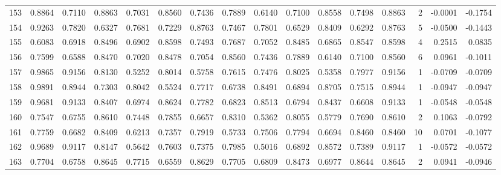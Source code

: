 \begin{tabular}{lrrrrrrrrrrrrrrr}
153 &      0.8864 &  0.7110 &  0.8863 &  0.7031 &  0.8560 &  0.7436 &  0.7889 &  0.6140 &  0.7100 &  0.8558 &   0.7498 &     0.8863 &      2 &                   -0.0001 &                    -0.1754 \\
154 &      0.9263 &  0.7820 &  0.6327 &  0.7681 &  0.7229 &  0.8763 &  0.7467 &  0.7801 &  0.6529 &  0.8409 &   0.6292 &     0.8763 &      5 &                   -0.0500 &                    -0.1443 \\
155 &      0.6083 &  0.6918 &  0.8496 &  0.6902 &  0.8598 &  0.7493 &  0.7687 &  0.7052 &  0.8485 &  0.6865 &   0.8547 &     0.8598 &      4 &                    0.2515 &                     0.0835 \\
156 &      0.7599 &  0.6588 &  0.8470 &  0.7020 &  0.8478 &  0.7054 &  0.8560 &  0.7436 &  0.7889 &  0.6140 &   0.7100 &     0.8560 &      6 &                    0.0961 &                    -0.1011 \\
157 &      0.9865 &  0.9156 &  0.8130 &  0.5252 &  0.8014 &  0.5758 &  0.7615 &  0.7476 &  0.8025 &  0.5358 &   0.7977 &     0.9156 &      1 &                   -0.0709 &                    -0.0709 \\
158 &      0.9891 &  0.8944 &  0.7303 &  0.8042 &  0.5524 &  0.7717 &  0.6738 &  0.8491 &  0.6894 &  0.8705 &   0.7515 &     0.8944 &      1 &                   -0.0947 &                    -0.0947 \\
159 &      0.9681 &  0.9133 &  0.8407 &  0.6974 &  0.8624 &  0.7782 &  0.6823 &  0.8513 &  0.6794 &  0.8437 &   0.6608 &     0.9133 &      1 &                   -0.0548 &                    -0.0548 \\
160 &      0.7547 &  0.6755 &  0.8610 &  0.7448 &  0.7855 &  0.6657 &  0.8310 &  0.5362 &  0.8055 &  0.5779 &   0.7690 &     0.8610 &      2 &                    0.1063 &                    -0.0792 \\
161 &      0.7759 &  0.6682 &  0.8409 &  0.6213 &  0.7357 &  0.7919 &  0.5733 &  0.7506 &  0.7794 &  0.6694 &   0.8460 &     0.8460 &     10 &                    0.0701 &                    -0.1077 \\
162 &      0.9689 &  0.9117 &  0.8147 &  0.5642 &  0.7603 &  0.7375 &  0.7985 &  0.5016 &  0.6892 &  0.8572 &   0.7389 &     0.9117 &      1 &                   -0.0572 &                    -0.0572 \\
163 &      0.7704 &  0.6758 &  0.8645 &  0.7715 &  0.6559 &  0.8629 &  0.7705 &  0.6809 &  0.8473 &  0.6977 &   0.8644 &     0.8645 &      2 &                    0.0941 &                    -0.0946 \\

\end{tabular}
